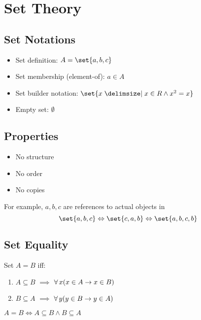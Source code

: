 \section{Set Theory}

\subsection{Set Notations}
\begin{itemize}
    \item Set definition: $A = \set{a, b, c}$
    \item Set membership (element-of): $a \in A$
    \item Set builder notation: $\set{x \given x \in \Real \land x^2 = x}$
    \item Empty set: $\emptyset$
\end{itemize}

\subsection{Properties}
\begin{itemize}
    \item No structure
    \item No order
    \item No copies
\end{itemize}

For example, $a, b, c$ are references to actual objects in
\begin{equation*}
    \set{a, b, c} \Leftrightarrow \set{c, a, b} \Leftrightarrow \set{a, b, c, b}
\end{equation*}

\subsection{Set Equality}
\begin{definition}
    Set $A = B$ iff:
    \begin{enumerate}
        \item $A \subseteq B$ $\implies$ $\operatorname{\forall} x (x \in A \to x \in B)$
        \item $B \subseteq A$ $\implies$ $\operatorname{\forall} y (y \in B \to y \in A)$
    \end{enumerate}
\end{definition}

\begin{remark}
    $A = B \Leftrightarrow A \subseteq B \land B \subseteq A$
\end{remark}

